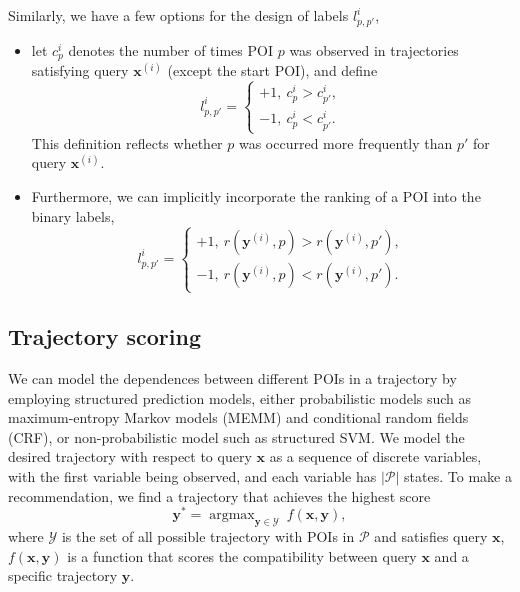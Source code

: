\documentclass[9pt]{extarticle}
\DeclareMathOperator*{\argmax}{argmax}
\begin{document}
Similarly, we have a few options for the design of labels $l_{p,p'}^i$,
\begin{itemize}
\item let $c_p^i$ denotes the number of times POI $p$ was observed in trajectories satisfying query $\mathbf{x}^{(i)}$ (except the start POI), and define
      \begin{equation*}
      l_{p,p'}^i = \begin{cases}
      +1,~ c_p^i > c_{p'}^i, \\
      -1,~ c_p^i < c_{p'}^i.
      \end{cases}
      \end{equation*}
      This definition reflects whether $p$ was occurred more frequently than $p'$ for query $\mathbf{x}^{(i)}$.
\item Furthermore, we can implicitly incorporate the ranking of a POI into the binary labels,
      \begin{equation*}
      l_{p,p'}^i = \begin{cases}
      +1,~ r(\mathbf{y}^{(i)}, p) > r(\mathbf{y}^{(i)}, p'), \\
      -1,~ r(\mathbf{y}^{(i)}, p) < r(\mathbf{y}^{(i)}, p').
      \end{cases}
      \end{equation*}
\end{itemize}



\subsection{Trajectory scoring}
\label{sec:structured}

We can model the dependences between different POIs in a trajectory by employing structured prediction models,
either probabilistic models such as maximum-entropy Markov models (MEMM) and conditional random fields (CRF),
or non-probabilistic model such as structured SVM.
We model the desired trajectory with respect to query $\mathbf{x}$ as a sequence of discrete variables, 
with the first variable being observed, and each variable has $|\mathcal{P}|$ states.
To make a recommendation, we find a trajectory that achieves the highest score
\begin{equation*}
\mathbf{y}^* = \argmax_{\mathbf{y} \in \mathcal{Y}}~ f(\mathbf{x}, \mathbf{y}),
\end{equation*}
where $\mathcal{Y}$ is the set of all possible trajectory with POIs in $\mathcal{P}$ and satisfies query $\mathbf{x}$,
$f(\mathbf{x}, \mathbf{y})$ is a function that scores the compatibility between query $\mathbf{x}$ and a specific trajectory $\mathbf{y}$.
\end{document}
